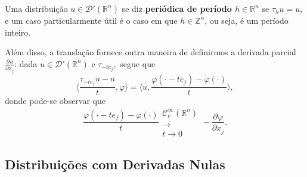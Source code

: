 \documentclass[../distribution_theory_notes.tex]{subfiles}
\begin{document}
  \begin{tcolorbox}[
  skin=enhanced,
  title=Observação,
  fonttitle=\bfseries,
colframe=black,
  colbacktitle=cyan!75!white, 
  colback=cyan!15,
  colbacklower=black,
coltitle=black,
  drop fuzzy shadow,
  ]
  Uma distribuição \(u\in \mathcal{D}'(\mathbb{R}^{n})\) se diz \textbf{periódica de período \(h\in \mathbb{R}^{n}\)} se \(\tau_h u = u\), e um caso particularmente útil é o caso em que \(h\in \mathbb{Z}^{n}\), ou seja, é um período inteiro.
  \end{tcolorbox}
   \begin{tcolorbox}[
   skin=enhanced,
   title=Observação,
   fonttitle=\bfseries,
 colframe=black,
   colbacktitle=cyan!75!white, 
   colback=cyan!15,
   colbacklower=black,
 coltitle=black,
   drop fuzzy shadow,
   ]
   Além disso, a translação fornece outra maneira de definirmos a derivada parcial \(\frac{\partial^{}u}{\partial x_{j}^{}}\): dada \(u\in \mathcal{D}'(\mathbb{R}^{n})\) e \(\tau_{-te_{j}},\) segue que 
     \[
       \biggl\langle \frac{\tau_{-te_{j}}u - u}{t}, \varphi  \biggr\rangle = \biggl\langle u, \frac{\varphi (\cdot -te_{j}) - \varphi (\cdot )}{t} \biggr\rangle,
     \]
     donde pode-se observar que 
       \[
         \frac{\varphi (\cdot -te_{j}) - \varphi (\cdot )}{t} \substack{\mathcal{C}_{c}^{\infty}(\mathbb{R}^{n}) \\ \longrightarrow \\ t\to 0} - \frac{\partial^{}\varphi }{\partial x_{j}^{}}.
       \]
   \end{tcolorbox}

   \subsection{Distribuições com Derivadas Nulas}
\end{document}
